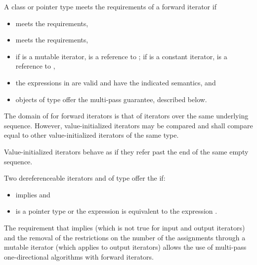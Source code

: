 \pnum
A class or pointer type
meets the requirements of a forward iterator if
\begin{itemize}
\item {} meets the  requirements,

\item {} meets the 
requirements,

\item if  is a mutable iterator,  is a reference to ;
if  is a constant iterator,  is a reference to ,

\item the expressions in 
are valid and have the indicated semantics, and

\item objects of type  offer the multi-pass guarantee, described below.
\end{itemize}

\pnum
The domain of \tcode{==} for forward iterators is that of iterators over the same
underlying sequence. However, value-initialized iterators may be compared and
shall compare equal to other value-initialized iterators of the same type.
\begin{note}
Value-initialized iterators behave as if they refer past the end of
the same empty sequence.
\end{note}

\pnum
Two dereferenceable iterators  and  of type  offer the
 if:
\begin{itemize}
\item {} implies  and
\item {} is a pointer type or the expression
 is equivalent to the expression .
\end{itemize}

\pnum
\begin{note}
The requirement that
implies
(which is not true for input and output iterators)
and the removal of the restrictions on the number of the assignments through
a mutable iterator
(which applies to output iterators)
allows the use of multi-pass one-directional algorithms with forward iterators.
\end{note}

